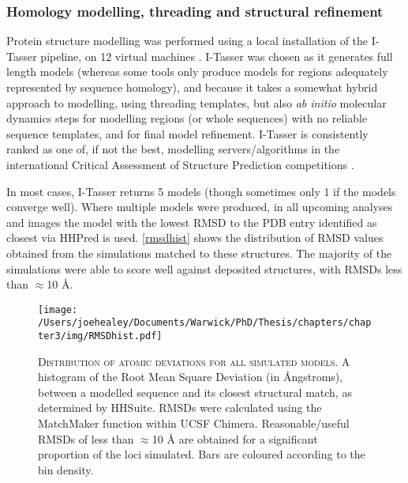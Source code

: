 \subsubsection{Homology modelling, threading and structural refinement}
Protein structure modelling was performed using a local installation of the I-Tasser pipeline, on 12 virtual machines \citep{Yang2014, Roy2010, Zhang2008}. I-Tasser was chosen as it generates full length models (whereas some tools only produce models for regions adequately represented by sequence homology), and because it takes a somewhat hybrid approach to modelling, using threading templates, but also \emph{ab initio} molecular dynamics steps for modelling regions (or whole sequences) with no reliable sequence templates, and for final model refinement. I-Tasser is consistently ranked as one of, if not the best, modelling servers/algorithms in the international Critical Assessment of Structure Prediction competitions \citep{Moult2015}.

In most cases, I-Tasser returns 5 models (though sometimes only 1 if the models converge well). Where multiple models were produced, in all upcoming analyses and images the model with the lowest RMSD to the PDB entry identified as closest via HHPred is used. \vref{rmsdhist} shows the distribution of RMSD values obtained from the simulations matched to these structures. The majority of the simulations were able to score well against deposited structures, with RMSDs less than $\approx$10 \AA.

\begin{figure}[h]
\centering
{}
\texttt{[image: /Users/joehealey/Documents/Warwick/PhD/Thesis/chapters/chapter3/img/RMSDhist.pdf]}
	\captionsetup{singlelinecheck=off, justification=justified, font=footnotesize, aboveskip=10pt}
	\caption[I-Tasser model accuracy distribution - RMSD]{\textsc{\normalsize Distribution of atomic deviations for all simulated models.}\vspace{0.1cm} \newline A histogram of the Root Mean Square Deviation (in \AA{}ngstroms), between a modelled sequence and its closest structural match, as determined by HHSuite. RMSDs were calculated using the MatchMaker function within UCSF Chimera. Reasonable/useful RMSDs of less than $\approx$10 \AA{} are obtained for a significant proportion of the loci simulated. Bars are coloured according to the bin density.}
	\label{rmsdhist}
\end{figure}

